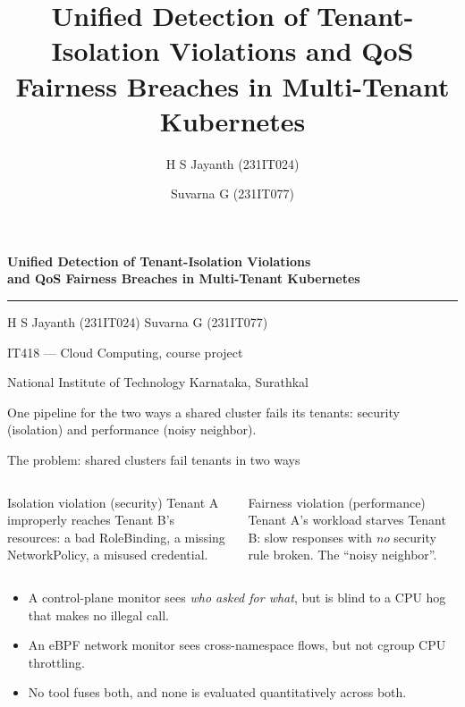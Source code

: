 \documentclass[aspectratio=169,11pt]{beamer}
\title{Unified Detection of Tenant-Isolation Violations and QoS Fairness Breaches in Multi-Tenant Kubernetes}
\author{H S Jayanth (231IT024) \and Suvarna G (231IT077)}
\institute{IT418 --- Cloud Computing\\National Institute of Technology Karnataka, Surathkal}
\date{}
\begin{document}
\begin{frame}[plain]
\vspace{8mm}
{\color{navy}\Large\bfseries Unified Detection of Tenant-Isolation Violations\\and QoS Fairness Breaches in Multi-Tenant Kubernetes\par}
\vspace{4mm}
{\color{teal}\rule{0.45\textwidth}{1.5pt}}\par\vspace{4mm}
\large H S Jayanth (231IT024) \quad Suvarna G (231IT077)\par
\vspace{1mm}\normalsize IT418 --- Cloud Computing, course project\par\normalsize National Institute of Technology Karnataka, Surathkal\par
\vspace{8mm}
\small One pipeline for the two ways a shared cluster fails its tenants: \alert{security} (isolation) and \alert{performance} (noisy neighbor).
\end{frame}

\begin{frame}{The problem: shared clusters fail tenants in two ways}
\begin{columns}[T]
\begin{block}{Isolation violation (security)}
Tenant A improperly reaches Tenant B's resources: a bad RoleBinding, a missing NetworkPolicy, a misused credential.
\end{block}
\begin{block}{Fairness violation (performance)}
Tenant A's workload starves Tenant B: slow responses with \emph{no} security rule broken. The ``noisy neighbor''.
\end{block}
\end{columns}
\vspace{3mm}
\begin{itemize}
\item A control-plane monitor sees \emph{who asked for what}, but is blind to a CPU hog that makes no illegal call.
\item An eBPF network monitor sees cross-namespace flows, but not cgroup CPU throttling.
\item \alert{No tool fuses both, and none is evaluated quantitatively across both.}
\end{itemize}
\end{frame}
\end{document}
